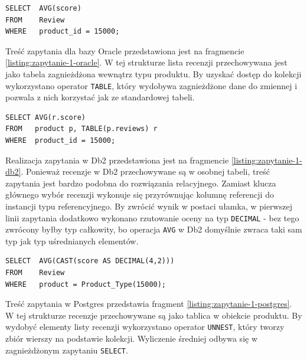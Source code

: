 \documentclass[a4paper,twoside,12pt]{book}
\begin{document}
\begin{lstlisting}[style=SQL, caption={Zapytanie pierwsze w podejściu relacyjnym.}, label={listing:zapytanie-1-rel}, captionpos=b]
SELECT  AVG(score)
FROM    Review
WHERE   product_id = 15000;
\end{lstlisting}

Treść zapytania dla bazy Oracle przedstawiona jest na fragmencie \ref{listing:zapytanie-1-oracle}. W tej strukturze lista recenzji przechowywana jest jako tabela zagnieżdżona wewnątrz typu produktu. By uzyskać dostęp do kolekcji wykorzystano operator \lstinline{TABLE}, który wydobywa zagnieżdżone dane do zmiennej i pozwala z nich korzystać jak ze standardowej tabeli.

\begin{lstlisting}[style=SQL, caption={Zapytanie pierwsze w Oracle.}, label={listing:zapytanie-1-oracle}, captionpos=b]
SELECT AVG(r.score)
FROM   product p, TABLE(p.reviews) r
WHERE  product_id = 15000;
\end{lstlisting}

\vspace{0.1cm}

Realizacja zapytania w Db2 przedstawiona jest na fragmencie \ref{listing:zapytanie-1-db2}. Ponieważ recenzje w Db2 przechowywane są w osobnej tabeli, treść zapytania jest bardzo podobna do rozwiązania relacyjnego. Zamiast klucza głównego wybór recenzji wykonuje się przyrównując kolumnę referencji do instancji typu referencyjnego. By zwrócić wynik w postaci ułamka, w pierwszej linii zapytania dodatkowo wykonano rzutowanie oceny na typ \lstinline{DECIMAL} - bez tego zwrócony byłby typ całkowity, bo operacja \lstinline{AVG} w Db2 domyślnie zwraca taki sam typ jak typ uśrednianych elementów.

\vspace{0.1cm}

\begin{lstlisting}[style=SQL, caption={Zapytanie pierwsze w Db2.}, label={listing:zapytanie-1-db2}, captionpos=b]
SELECT  AVG(CAST(score AS DECIMAL(4,2)))
FROM    Review
WHERE   product = Product_Type(15000);
\end{lstlisting}

Treść zapytania w Postgres przedstawia fragment \ref{listing:zapytanie-1-postgres}. W tej strukturze recenzje przechowywane są jako tablica w obiekcie produktu. By wydobyć elementy listy recenzji wykorzystano operator \lstinline{UNNEST}, który tworzy zbiór wierszy na podstawie kolekcji. Wyliczenie średniej odbywa się w zagnieżdżonym zapytaniu \lstinline{SELECT}.
\end{document}
